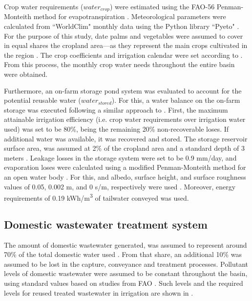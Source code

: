 Crop water requirements ($water_{crop}$) were estimated using the FAO-56 Penman-Monteith method for evapotranspiration \cite{allenFAOIrrigationDrainage1998}. Meteorological parameters were calculated from ``WorldClim" monthly data \cite{WorldClimGlobalClimate}  using the Python library ``Pyeto" \cite{pyeto}. For the purpose of this study, date palms and vegetables were assumed to cover in equal shares the cropland area---as they represent the main crops cultivated in the region \cite{almullaNWSAS,Socioeconomicaspectsirrigation2014}. The crop coefficients and irrigation calendar were set according to \cite{almullaNWSAS}. From this process, the monthly crop water needs throughout the entire basin were obtained.

Furthermore, an on-farm storage pond system was evaluated to account for the potential reusable water ($water_{stored}$). For this, a water balance on the on-farm storage was executed following a similar approach to \citet{reinhartSimulatedWaterQuality2019}. First, the maximum attainable irrigation efficiency (i.e. crop water requirements over irrigation water used) was set to be 80\%, being the remaining 20\% non-recoverable loses. If additional water was available, it was recovered and stored. The storage reservoir surface area, was assumed at 2\% of the cropland area and a standard depth of 3 meters \cite{reinhartSimulatedWaterQuality2019}. Leakage losses in the storage system were set to be 0.9 mm/day, and evaporation loses were calculated using a modified Penman-Monteith method for an open water body \cite{reinhartSimulatedWaterQuality2019}. For this, and albedo, surface height, and surface roughness values of 0.05, 0.002 m, and 0 s/m, respectively were used \cite{princeczarneckijobym.QuantifyingCaptureUse2017}. Moreover, energy requirements of 0.19 kWh/m\textsuperscript{3} of tailwater conveyed was used.

\subsection{Domestic wastewater treatment system}
The amount of domestic wastewater generated, was assumed to represent around 70\% of the total domestic water used \cite{unescoWastewaterUntappedResource2017}. From that share, an additional 10\% was assumed to be lost in the capture, conveyance and treatment processes. Pollutant levels of domestic wastewater were assumed to be constant throughout the basin, using standard values based on studies from FAO \cite{fao1985water}. Such levels and the required levels for reused treated wastewater in irrigation are shown in .

